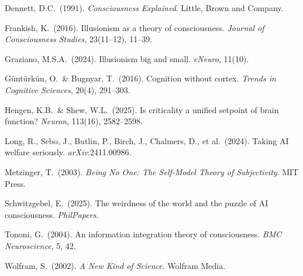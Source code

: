 \documentclass[11pt]{article}
\begin{document}
\begin{enumerate}[label={[\arabic*]}, nosep, leftmargin=*]
\item \label{ref:dennett} Dennett, D.C.\ (1991). \emph{Consciousness Explained}. Little, Brown and Company.

\item \label{ref:frankish} Frankish, K.\ (2016). Illusionism as a theory of consciousness. \emph{Journal of Consciousness Studies}, 23(11--12), 11--39.

\item \label{ref:graziano2024} Graziano, M.S.A.\ (2024). Illusionism big and small. \emph{eNeuro}, 11(10).

\item \label{ref:gunturkun} G\"{u}nt\"{u}rk\"{u}n, O.\ \& Bugnyar, T.\ (2016). Cognition without cortex. \emph{Trends in Cognitive Sciences}, 20(4), 291--303.

\item \label{ref:hengen} Hengen, K.B.\ \& Shew, W.L.\ (2025). Is criticality a unified setpoint of brain function? \emph{Neuron}, 113(16), 2582--2598.

\item \label{ref:long} Long, R., Sebo, J., Butlin, P., Birch, J., Chalmers, D., et al.\ (2024). Taking AI welfare seriously. \emph{arXiv}:2411.00986.

\item \label{ref:metzinger} Metzinger, T.\ (2003). \emph{Being No One: The Self-Model Theory of Subjectivity}. MIT Press.

\item \label{ref:schwitzgebel} Schwitzgebel, E.\ (2025). The weirdness of the world and the puzzle of AI consciousness. \emph{PhilPapers}.

\item \label{ref:tononi} Tononi, G.\ (2004). An information integration theory of consciousness. \emph{BMC Neuroscience}, 5, 42.

\item \label{ref:wolfram} Wolfram, S.\ (2002). \emph{A New Kind of Science}. Wolfram Media.

\end{enumerate}
\end{document}
